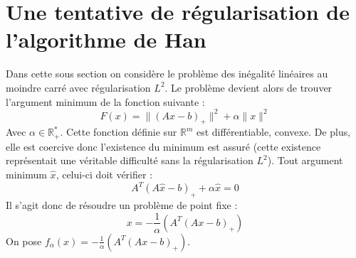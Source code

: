 \documentclass[10pt,a4paper]{article}
\begin{document}
\section{Une tentative de régularisation de l'algorithme de Han}

Dans cette sous section on considère le problème des inégalité linéaires au moindre carré avec régularisation $L^2$.
Le problème devient alors de trouver l'argument minimum de la fonction suivante :
\begin{equation}
F(x) = \| (Ax-b)_+ \|^2+ \alpha \| x\|^2
\end{equation}
Avec $\alpha \in \mathbb{R}_+^*$.
Cette fonction définie sur $\mathbb{R}^m$ est différentiable, convexe.
De plus, elle est coercive donc l'existence du minimum est assuré (cette existence représentait une véritable difficulté sans la régularisation $L^2$).
Tout argument minimum $\hat{x}$, celui-ci doit vérifier :
\begin{equation}
A^T(A \hat{x}-b)_+ + \alpha \hat{x}=0
\end{equation}
Il s'agit donc de résoudre un problème de point fixe :
\begin{equation}
x=-\frac{1}{\alpha}\left( A^T(Ax-b)_+\right)
\end{equation}
On pose $f_{\alpha}(x)=-\frac{1}{\alpha}\left( A^T(Ax-b)_+\right)$.
\end{document}
